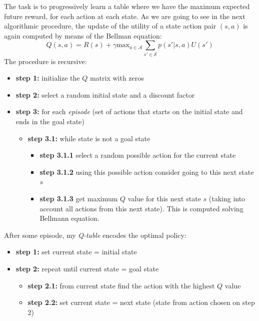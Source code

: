 The task is to progressively learn a table where we have the maximum expected future reward, for each action at each state. As we are going to see in the next algorithmic procedure, the update of the utility of a state action pair $(s,a)$ is again computed by means of the Bellman equation:
\begin{equation}
    Q(s,a) = R(s) + \gamma \text{max}_{a \in \mathcal{A}}\sum_{s' \in \mathcal{S}} p(s'|s,a) U(s')
\end{equation}
The procedure is recursive:
\begin{itemize}
    \item \textbf{step 1:} initialize the $Q$ matrix with zeros
    
    \item \textbf{step 2:} select a random initial state and a discount factor
    
    \item \textbf{step 3:} for each \textit{episode} (set of actions that starts on the initial state and ends in the goal state)
    \begin{itemize}
        \item \textbf{step 3.1:} while state is not a goal state
        \begin{itemize}
            \item \textbf{step 3.1.1} select a random possible action for the current state
            
            \item \textbf{step 3.1.2} using this possible action consider going to this next state $s$
            
            \item \textbf{step 3.1.3} get maximum $Q$ value for this next state $s$ (taking into account all actions from this next state). This is computed solving Bellmann equation.
        \end{itemize}
    \end{itemize}
\end{itemize}

After some episode, my \textit{Q-table} encodes the optimal policy:
\begin{itemize}
    \item \textbf{step 1:} set current state = initial state
    
    \item \textbf{step 2:} repeat until current state = goal state
    
    \begin{itemize}
        \item \textbf{step 2.1:} from current state find the action with the highest $Q$ value
        \item \textbf{step 2.2:} set current state = next state (state from action chosen on step 2)
    \end{itemize}
\end{itemize}

